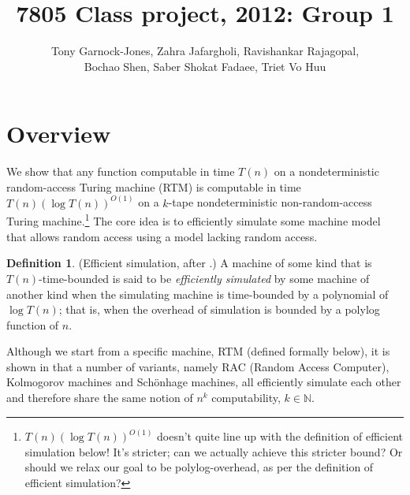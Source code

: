 \documentclass[english]{article}
\theoremstyle{plain}
\theoremstyle{definition}
\newtheorem{defn}[thm]{Definition}
\theoremstyle{plain}
\begin{document}
\title{7805 Class project, 2012: Group 1}
\author{
  Tony Garnock-Jones,
  Zahra Jafargholi,
  Ravishankar Rajagopal,\\
  Bochao Shen,
  Saber Shokat Fadaee,
  Triet Vo Huu
}
\maketitle

\section{Overview}

We show that any function computable in time $T(n)$ on a
nondeterministic random-access Turing machine (RTM) is computable in
time $T(n)(\log T(n))^{O(1)}$ on a $k$-tape nondeterministic
non-random-access Turing machine.\footnote{$T(n)(\log T(n))^{O(1)}$
  doesn't quite line up with the definition of efficient simulation
  below! It's stricter; can we actually achieve this stricter bound?
  Or should we relax our goal to be polylog-overhead, as per the
  definition of efficient simulation?}
The core idea is to efficiently simulate some machine model that
allows random access using a model lacking random access.

\begin{defn}

  (Efficient simulation, after \cite{DBLP:conf/ershov/GurevichS89}.) A
  machine of some kind that is $T(n)$-time-bounded is said to be
  \emph{efficiently simulated} by some machine of another kind when
  the simulating machine is time-bounded by a polynomial of $\log
  T(n)$; that is, when the overhead of simulation is bounded by a
  polylog function of $n$.
\end{defn}

Although we start from a specific machine, RTM (defined formally
below), it is shown in \cite{DBLP:conf/ershov/GurevichS89} that a
number of variants, namely RAC (Random Access Computer), Kolmogorov
machines and Sch\"{o}nhage machines, all efficiently simulate each
other and therefore share the same notion of $n^k$ computability,
$k\in\mathbb{N}$.
\end{document}
